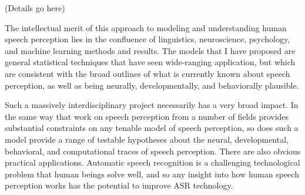 \documentclass[12pt]{article}
\begin{document}
(Details go here)

The intellectual merit of this approach to modeling and understanding human speech perception lies in the confluence of linguistics, neuroscience, psychology, and machine learning methods and results.  The models that I have proposed are general statistical techniques that have seen wide-ranging application, but which are consistent with the broad outlines of what is currently known about speech perception, as well as being neurally, developmentally, and behaviorally plausible.

Such a massively interdisciplinary project necessarily has a very broad impact.  In the same way that work on speech perception from a number of fields provides substantial constraints on any tenable model of speech perception, so does such a model provide a range of testable hypotheses about the neural, developmental, behavioral, and computational traces of speech perception.  There are also obvious practical applications.  Automatic speech recognition is a challenging technological problem that human beings solve well, and so any insight into how human speech perception works has the potential to improve ASR technology.  
\end{document}
